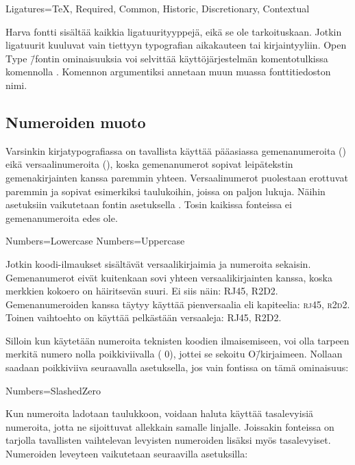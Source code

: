 \begin{koodilohkosis}
  Ligatures={TeX, Required, Common, Historic, Discretionary,
    Contextual}
\end{koodilohkosis}

Harva fontti sisältää kaikkia ligatuurityyppejä, eikä se ole
tarkoituskaan. Jotkin ligatuurit kuuluvat vain tiettyyn typografian
aikakauteen tai kirjaintyyliin. Open Type \=/fontin ominaisuuksia voi
selvittää käyttöjärjestelmän komentotulkissa komennolla
. Komennon argumentiksi annetaan muun muassa
fonttitiedoston nimi.

\subsection{Numeroiden muoto}

Varsinkin kirjatypografiassa on tavallista käyttää pääasiassa
gemenanumeroita ({}) eikä versaalinumeroita
({}), koska gemenanumerot sopivat leipätekstin
gemenakirjainten kanssa paremmin yhteen. Versaalinumerot puolestaan
erottuvat paremmin ja sopivat esimerkiksi taulukoihin, joissa on paljon
lukuja. Näihin asetuksiin vaikutetaan fontin asetuksella
. Tosin kaikissa fonteissa ei gemenanumeroita edes ole.

\begin{koodilohkosis}
  Numbers=Lowercase %
  Numbers=Uppercase %
\end{koodilohkosis}

Jotkin koodi-ilmaukset sisältävät versaalikirjaimia ja numeroita
sekaisin. Gemenanumerot eivät kuitenkaan sovi yhteen versaalikirjainten
kanssa, koska merkkien koko\-ero on häiritsevän suuri. Ei siis näin:
RJ45, R2D2. Gemenanumeroiden kanssa täytyy käyttää pienversaalia eli
kapiteelia: \textsc{rj45}, \textsc{r2d2}. Toinen vaihtoehto on käyttää
pelkästään versaaleja: {\versaalinum RJ45, R2D2}.

Silloin kun käytetään numeroita teknisten koodien ilmaisemiseen, voi
olla tarpeen merkitä numero nolla poikkiviivalla
({ 0}), jottei se
sekoitu O\=/kirjaimeen. Nollaan saadaan poikkiviiva seuraavalla
asetuksella, jos vain fontissa on tämä ominaisuus:

\begin{koodilohkosis}
  Numbers=SlashedZero
\end{koodilohkosis}

Kun numeroita ladotaan taulukkoon, voidaan haluta käyttää tasalevyisiä
numeroita, jotta ne sijoittuvat allekkain samalle linjalle. Joissakin
fonteissa on tarjolla tavallisten vaihtelevan levyisten numeroiden
lisäksi myös tasalevyiset. Numeroiden leveyteen vaikutetaan seuraavilla
asetuksilla:

